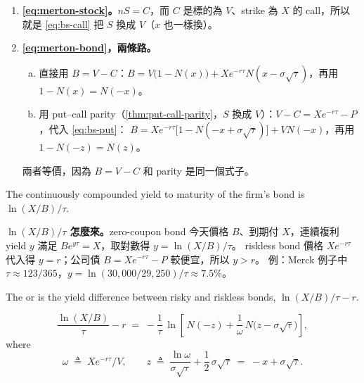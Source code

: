 
\begin{remark}
	\begin{enumerate}[(1),nosep]
		\item \textbf{\eqref{eq:merton-stock}。}$nS=C$，而 $C$ 是標的為 $V$、strike 為 $X$ 的 call，所以就是 \eqref{eq:bs-call} 把 $S$ 換成 $V$（$x$ 也一樣換）。
		\item \textbf{\eqref{eq:merton-bond}，兩條路。}
		      \begin{enumerate}[(a),nosep]
			      \item 直接用 $B=V-C$：$B=V\bigl(1-N(x)\bigr)+Xe^{-r\tau}N(x-\sigma\sqrt{\tau})$，再用 $1-N(x)=N(-x)$。
			      \item 用 put--call parity（\autoref{thm:put-call-parity}，$S$ 換成 $V$）：$V-C=Xe^{-r\tau}-P$，代入 \eqref{eq:bs-put}：
			            $B=Xe^{-r\tau}\bigl[1-N(-x+\sigma\sqrt{\tau})\bigr]+VN(-x)$，再用 $1-N(-z)=N(z)$。
		      \end{enumerate}
		      兩者等價，因為 $B=V-C$ 和 parity 是同一個式子。
	\end{enumerate}
\end{remark}
\suppend

The continuously compounded yield to maturity of the firm's bond is $\ln(X/B)/\tau$.

\suppstart
{}

\begin{remark}
	\textbf{$\ln(X/B)/\tau$ 怎麼來。}zero-coupon bond 今天價格 $B$、到期付 $X$，連續複利 yield $y$ 滿足 $Be^{y\tau}=X$，取對數得 $y=\ln(X/B)/\tau$。
	riskless bond 價格 $Xe^{-r\tau}$ 代入得 $y=r$；公司債 $B=Xe^{-r\tau}-P$ 較便宜，所以 $y>r$。
	例：Merck 例子中 $\tau\approx123/365$，$y=\ln(30{,}000/29{,}250)/\tau\approx7.5\%$。
\end{remark}
\suppend

\begin{definition}
	The  or  is the yield difference between risky and riskless bonds, $\ln(X/B)/\tau-r$.
\end{definition}

\suppstart
{}
\suppend

\begin{proposition}
	\label{prop:merton-spread}
	\begin{equation}
		\frac{\ln(X/B)}{\tau}-r \;=\; -\frac{1}{\tau}\,\ln\left[\,N(-z)+\frac{1}{\omega}\,N\bigl(z-\sigma\sqrt{\tau}\bigr)\right] ,
		\label{eq:merton-spread}
	\end{equation}
	where
	\[
		\omega \;\triangleq\; Xe^{-r\tau}/V ,
		\qquad
		z \;\triangleq\; \frac{\ln\omega}{\sigma\sqrt{\tau}}+\frac12\,\sigma\sqrt{\tau} \;=\; -x+\sigma\sqrt{\tau} .
	\]
\end{proposition}

